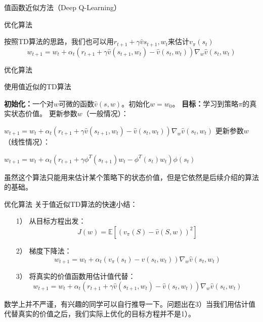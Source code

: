 \begin{section}{值函数近似方法\alert{（Deep Q-Learning）}}
\begin{frame}{优化算法}
\begin{itemize}
        按照TD算法的思路，我们也可以用$r_{t+1}+\gamma \hat{v}{s_{t+1},w_t}$来估计$v_\pi(s_t)$
        \[
            w_{t+1}=w_t+\alpha_t(r_{t+1}+\gamma \hat{v}(s_{t+1},w_t)-\hat{v}(s_t,w_t))\nabla_w\hat{v}(s_t,w_t)
        \]
    \end{itemize}
\end{frame}

\begin{frame}{优化算法}
    \begin{block}{使用值近似的TD算法}
        \begin{algorithmic}[1]
            \State \textbf{初始化：}一个对$w$可微的函数$\hat{v}(s,w)$。初始化$w=w_0$。
            \State \textbf{目标：}学习到策略$\pi$的真实状态价值。
                    \State 更新参数$w$（一般情况）：

                    $w_{t+1}=w_t+\alpha_t(r_{t+1}+\gamma \hat{v}(s_{t+1},w_t)-\hat{v}(s_t,w_t))\nabla_w\hat{v}(s_t,w_t)$
                    \State 更新参数$w$（线性情况）：

                    $w_{t+1}=w_t+\alpha_t(r_{t+1}+\gamma \phi^T(s_{t+1})w_t-\phi^T(s_t)w_t)\phi(s_t)$
                \EndFor
            \EndFor
        \end{algorithmic}
    \end{block}
    虽然这个算法只能用来估计某个策略下的状态价值，但是它依然是后续介绍的算法的基础。
\end{frame}

\begin{frame}{优化算法}
    关于值近似TD算法的快速小结：
    \begin{itemize}
        \item[1）] 从目标方程出发：
        \[
            J(w)=\mathbb{E}[(v_\pi(S)-\hat{v}(S,w))^2]
        \]
        \item[2）] 梯度下降法：
        \[
            w_{t+1}=w_t+\alpha_t(v_\pi(s_t)-\hat{v}(s_t,w_t))\nabla_w\hat{v}(s_t,w_t)
        \]
        \item[3）] 将真实的价值函数用估计值代替：  
        \[
            w_{t+1}=w_t+\alpha_t(r_{t+1}+\gamma \hat{v}(s_{t+1},w_t)-\hat{v}(s_t,w_t))\nabla_w\hat{v}(s_t,w_t)
        \]
    \end{itemize}
    数学上并不严谨，有兴趣的同学可以自行推导一下。问题出在3）当我们用估计值代替真实的价值之后，我们实际上优化的目标方程并不是1）。
\end{frame}


\end{section}
